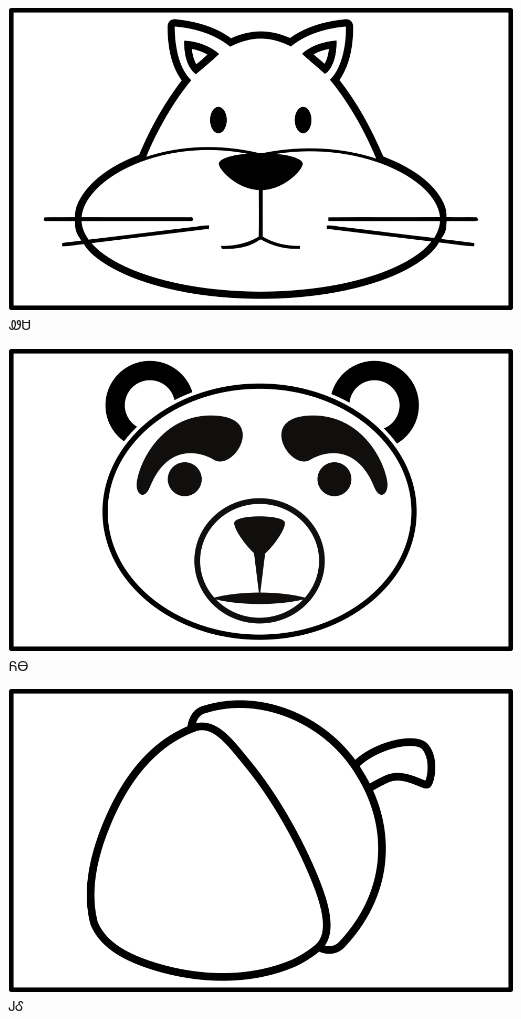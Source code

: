 \documentclass[avery5371]{flashcards}%
\begin{document}
    \begin{flashcard}{
        \includegraphics[width=0.95\columnwidth,height=.51\columnwidth,keepaspectratio]{../artwork/objects-animate/wesa}
    }
        \Huge ᏪᏌ
    \end{flashcard}

    \begin{flashcard}{
        \includegraphics[width=0.95\columnwidth,height=.51\columnwidth,keepaspectratio]{../artwork/objects-animate/yona}
    }
        \Huge ᏲᎾ
    \end{flashcard}


    \begin{flashcard}{
        \includegraphics[width=0.95\columnwidth,height=.51\columnwidth,keepaspectratio]{../artwork/objects-neutral/gule}
    }
        \Huge ᎫᎴ
    \end{flashcard}
\end{document}
